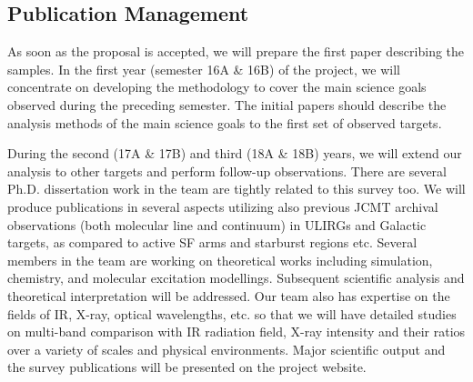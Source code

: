 \documentclass[legal,11pt]{article}
\begin{document}
\subsection{Publication Management} 

As soon as the proposal is accepted, we will prepare the first paper describing
the samples. In the first year (semester 16A \& 16B) of the project, we will
concentrate on developing the methodology to cover the main science goals
observed during the preceding semester. The initial papers should describe the
analysis methods of the main science goals to the first set of observed
targets.   



During the second (17A \& 17B) and third (18A \& 18B) years, we will extend our
analysis to other targets and perform follow-up observations. There are several
Ph.D. dissertation work in the team are tightly related to this survey too. We
will produce publications in several aspects utilizing also previous JCMT
archival observations (both molecular line and continuum) in ULIRGs and
Galactic targets, as compared to active SF arms and starburst regions etc.
Several members in the team are working on theoretical works including
simulation, chemistry, and molecular excitation modellings.  Subsequent
scientific analysis and theoretical interpretation will be addressed. Our team
also has expertise on the fields of IR, X-ray, optical wavelengths, etc.  so
that we will have detailed studies on multi-band comparison with IR radiation
field, X-ray intensity and their ratios over a variety of scales and physical
environments. Major scientific output and the survey publications will be
presented on the project website. 



\setlength{\bibsep}{0pt}
\begin{multicols}{2}

{\footnotesize
{}
}
\end{multicols}






\end{document}
